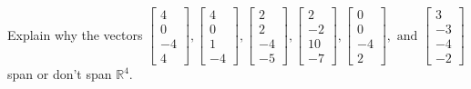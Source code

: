 \documentclass{article}
\begin{document}
\begin{exerciseStatement}
    Explain why the vectors \(\left[\begin{array}{r}
4 \\
0 \\
-4 \\
4
\end{array}\right] , \left[\begin{array}{r}
4 \\
0 \\
1 \\
-4
\end{array}\right] , \left[\begin{array}{r}
2 \\
2 \\
-4 \\
-5
\end{array}\right] , \left[\begin{array}{r}
2 \\
-2 \\
10 \\
-7
\end{array}\right] , \left[\begin{array}{r}
0 \\
0 \\
-4 \\
2
\end{array}\right] , \text{ and } \left[\begin{array}{r}
3 \\
-3 \\
-4 \\
-2
\end{array}\right]\) span or don't span \(\mathbb{R}^4\).



  
\end{exerciseStatement}
\end{document}
